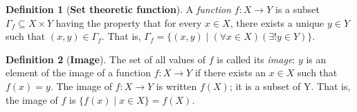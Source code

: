 \documentclass[a4paper, 12pt]{report}
\theoremstyle{definition}
\newtheorem{define}{Definition}
\begin{document}
\begin{doublespace}
\begin{singlespace}
\begin{define}[\textbf{Set theoretic function}]
    A \textit{function} \(f : X \rightarrow Y\) is a subset
    \(\Gamma_f \subseteq X \times Y\) having the property that for every
    \(x \in X\), there exists a unique \(y \in Y\) such that
    \((x,y) \in \Gamma_f\). That is,
    \(\Gamma_f = \{(x, y) \mid (\forall x \in X) (\exists! y \in Y)\}\).
\end{define}

\begin{define}[\textbf{Image}]
    The set of all values of \(f\) is called its \textit{image}:
    \(y\) is an element of the image of a function \(f: X \rightarrow Y\) if
    there exists an \(x \in X\) such that \(f(x) = y\).
    The image of \(f: X \rightarrow Y\) is written \(f(X)\);
    it is a subset of Y.
    That is, the image of \(f\) is
    \(\{f(x) \mid x \in X\} = f(X)\).
\end{define}
    
\end{singlespace}

\end{doublespace}
\end{document}
